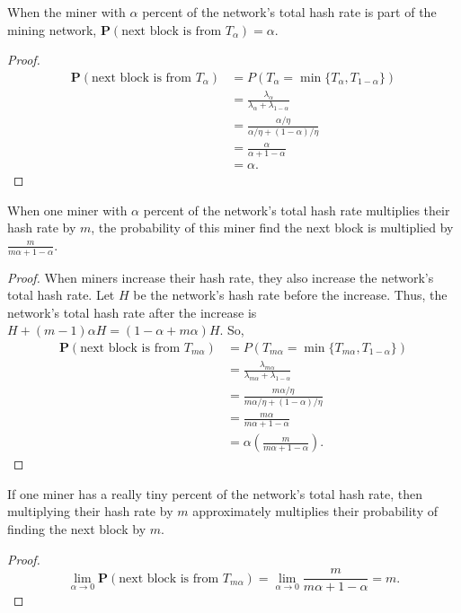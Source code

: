 \begin{theorem}
	When the miner with $\alpha$ percent of the network's total hash rate is part of the mining network, $\mathbf{P}(\text{next block is from $T_\alpha$}) = \alpha.$
\end{theorem}
\begin{proof}
\begin{align*}
	\mathbf{P}(\text{next block is from $T_\alpha$}) &= P \left( T_\alpha = \min\{T_\alpha, T_{1-\alpha}\} \right) \\
		&= \frac{\lambda_\alpha}{\lambda_\alpha + \lambda_{1-\alpha}} \\
		&= \frac{\alpha/\eta}{\alpha/\eta + (1-\alpha)/\eta} \\
		&= \frac{\alpha}{\alpha + 1 - \alpha} \\
		&= \alpha.
\end{align*}
\end{proof}

\begin{theorem}
	When one miner with $\alpha$ percent of the network's total hash rate multiplies their hash rate by $m$, the probability of this miner find the next block is multiplied by $\frac{m}{m \alpha + 1 - \alpha}$.
	\label{thm-miner-multiply}
\end{theorem}
\begin{proof}
	When miners increase their hash rate, they also increase the network's total hash rate. Let $H$ be the network's hash rate before the increase. Thus, the network's total hash rate after the increase is $H + (m-1) \alpha H = (1 - \alpha + m \alpha) H$. So,
\begin{align*}
	\mathbf{P}(\text{next block is from $T_{m \alpha}$}) &= P \left( T_{m \alpha} = \min\{T_{m \alpha}, T_{1-\alpha}\} \right) \\
		&= \frac{\lambda_{m \alpha}}{\lambda_{m \alpha} + \lambda_{1-\alpha}} \\
		&= \frac{m \alpha/\eta}{m \alpha/\eta + (1-\alpha)/\eta} \\
		&= \frac{m \alpha}{m \alpha + 1-\alpha} \\
		&= \alpha \left( \frac{m}{m \alpha + 1 - \alpha} \right).
\end{align*}
\end{proof}

\begin{cor}
	If one miner has a really tiny percent of the network's total hash rate, then multiplying their hash rate by $m$ approximately multiplies their probability of finding the next block by $m$.
\end{cor}
\begin{proof}
	$$\lim_{\alpha \rightarrow 0} \mathbf{P}(\text{next block is from $T_{m \alpha}$}) = \lim_{\alpha \rightarrow 0} \frac{m}{m \alpha + 1 - \alpha} = m.$$
\end{proof}

